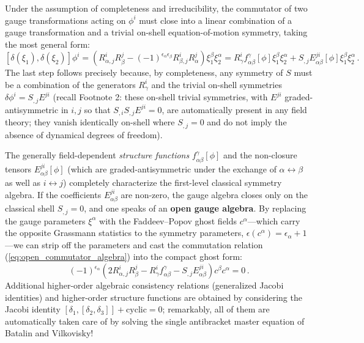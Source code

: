 Under the assumption of completeness and irreducibility, the commutator of two gauge transformations acting on \(\phi^i\) must close into a linear combination of a gauge transformation and a trivial on-shell equation-of-motion symmetry, taking the most general form:
\begin{equation} \label{eq:open_commutator_algebra}
    [\delta(\xi_1), \delta(\xi_2)] \phi^i = \left( R^i_{\alpha, j} R^j_\beta - (-1)^{\epsilon_\alpha \epsilon_\beta} R^i_{\beta, j} R^j_\alpha \right) \xi_1^\beta \xi_2^\alpha = R^i_\gamma f^\gamma_{\alpha\beta}[\phi] \xi_1^\beta \xi_2^\alpha + S_{,j} E^{ji}_{\alpha\beta}[\phi] \xi_1^\beta \xi_2^\alpha \, .
\end{equation}
The last step follows precisely because, by completeness, any symmetry of \(S\) must be a combination of the generators \(R^i_\gamma\) and the trivial on-shell symmetries \(\delta\phi^i = S_{,j} E^{ji}\) (recall Footnote 2: these on-shell trivial symmetries, with \(E^{ji}\) graded-antisymmetric in \(i, j\) so that \(S_{,i} S_{,j} E^{ji} = 0\), are automatically present in any field theory; they vanish identically on-shell where \(S_{,j} = 0\) and do not imply the absence of dynamical degrees of freedom).

The generally field-dependent \textit{structure functions} \(f^\gamma_{\alpha\beta}[\phi]\) and the non-closure tensors \(E^{ji}_{\alpha\beta}[\phi]\) (which are graded-antisymmetric under the exchange of \(\alpha \leftrightarrow \beta\) as well as \(i \leftrightarrow j\)) completely characterize the first-level classical symmetry algebra. If the coefficients \(E^{ji}_{\alpha\beta}\) are non-zero, the gauge algebra closes only on the classical shell \(S_{,j} = 0\), and one speaks of an \textbf{open gauge algebra}. By replacing the gauge parameters \(\xi^\alpha\) with the Faddeev--Popov ghost fields \(c^\alpha\)—which carry the opposite Grassmann statistics to the symmetry parameters, \(\epsilon(c^\alpha) = \epsilon_\alpha + 1\)—we can strip off the parameters and cast the commutation relation (\ref{eq:open_commutator_algebra}) into the compact ghost form:
\begin{equation} \label{eq:open_algebra_ghost_form}
    (-1)^{\epsilon_\alpha} \left( 2 R^i_{\alpha, j} R^j_\beta - R^i_\gamma f^\gamma_{\alpha\beta} - S_{,j} E^{ji}_{\alpha\beta} \right) c^\beta c^\alpha = 0 \, .
\end{equation}
Additional higher-order algebraic consistency relations (generalized Jacobi identities) and higher-order structure functions are obtained by considering the Jacobi identity \([\delta_1, [\delta_2, \delta_3]] + \text{cyclic} = 0\); remarkably, all of them are automatically taken care of by solving the single antibracket master equation of Batalin and Vilkovisky!

